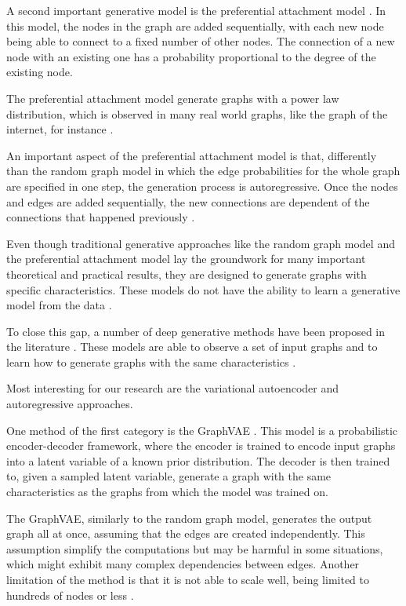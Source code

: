 \documentclass[12pt,a4paper]{article}
\begin{document}
	A second important generative model is the preferential attachment model \citep{AlbertandBarabási2002}. In this model, the nodes in the graph are added sequentially, with each new node being able to connect to a fixed number of other nodes. The connection of a new node with an existing one has a probability proportional to the degree of the existing node.
	
	The preferential attachment model generate graphs with a power law distribution, which is observed in many real world graphs, like the graph of the internet, for instance \citep{Newman2019}.
	
	An important aspect of the preferential attachment model is that, differently than the random graph model in which the edge probabilities for the whole graph are specified in one step, the generation process is autoregressive. Once the nodes and edges are added sequentially, the new connections are dependent of the connections that happened previously \citep{Hamilton2020}.
	
	Even though traditional generative approaches like the random graph model and the preferential attachment model lay the groundwork for many important theoretical and practical results, they are designed to generate graphs with specific characteristics. These models do not have the ability to learn a generative model from the data \citep{Hamilton2020}.
	
	To close this gap, a number of deep generative methods have been proposed in the literature \citep{KipfandWelling2016, SimonovskyandKomodakis2018, DeCao2018, Li2018, You2018, Liao2019}. These models are able to observe a set of input graphs and to learn how to generate graphs with the same characteristics \citep{Hamilton2020}.
	
	Most interesting for our research are the variational autoencoder \citep{KipfandWelling2016, SimonovskyandKomodakis2018} and autoregressive \citep{Li2018, You2018, Liao2019} approaches.
	
	One method of the first category is the GraphVAE \citep{SimonovskyandKomodakis2018}. This model is a probabilistic encoder-decoder framework, where the encoder is trained to encode input graphs into a latent variable of a known prior distribution. The decoder is then trained to, given a sampled latent variable, generate a graph with the same characteristics as the graphs from which the model was trained on.
	
	The GraphVAE, similarly to the random graph model, generates the output graph all at once, assuming that the edges are created independently. This assumption simplify the computations but may be harmful in some situations, which might exhibit many complex dependencies between edges. Another limitation of the method is that it is not able to scale well, being limited to hundreds of nodes or less  \citep{Hamilton2020}.
	
\end{document}
